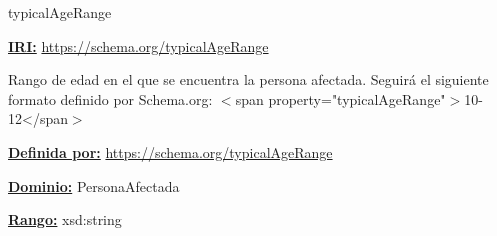 \begin{mybox}{typicalAgeRange}
\begin{flushleft}
\underline{\textbf{IRI:}}
\url{https://schema.org/typicalAgeRange}
\newline

Rango de edad en el que se encuentra la persona afectada.
\newline Seguirá el siguiente formato definido por Schema.org: 
\newline  %
$<$span property="typicalAgeRange"$>$10-12</span$>$  \cite{schema_typicalAgeRange}
\newline

\underline{\textbf{Definida por:}}\newline
\url{https://schema.org/typicalAgeRange}
\newline

\underline{\textbf{Dominio:}}  PersonaAfectada
\newline

\underline{\textbf{Rango:}} xsd:string
\newline

\end{flushleft}
\end{mybox}










